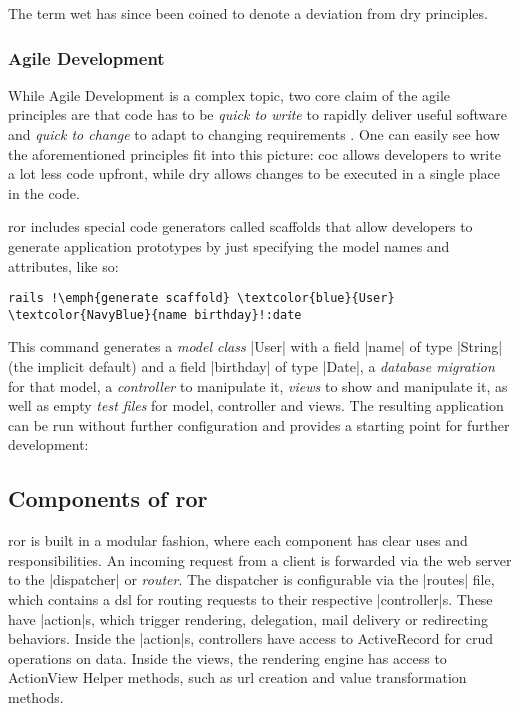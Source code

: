 The term \acrfull{wet} has since been coined to denote a deviation from \gls{dry} principles. \citep{wet}

\subsubsection{Agile Development}
\label{subsub:agile}

While Agile Development is a complex topic, two core claim of the agile principles are that code has to be \emph{quick to write} to rapidly deliver useful software \citep[Principle 1]{martin2003agile} and \emph{quick to change} to adapt to changing requirements \citep[Principle 2]{martin2003agile}. One can easily see how the aforementioned principles fit into this picture: \acrshort{coc} allows developers to write a lot less code upfront, while \acrshort{dry} allows changes to be executed in a single place in the code.

\gls{ror} includes special code generators called \gls{scaffold}s that allow developers to generate application prototypes by just specifying the model names and attributes, like so:

\begin{lstlisting}[escapechar=!]
  rails !\emph{generate scaffold} \textcolor{blue}{User} \textcolor{NavyBlue}{name birthday}!:date
\end{lstlisting}

This command generates a \emph{model class} |User| with a field |name| of type |String| (the implicit default) and a field |birthday| of type |Date|, a \emph{database migration} for that model, a \emph{controller} to manipulate it, \emph{views} to show and manipulate it, as well as empty \emph{test files} for model, controller and views. The resulting application can be run without further configuration and provides a starting point for further development:


\subsection{Components of \acrlong{ror}}

\gls{ror} is built in a modular fashion, where each component has clear uses and responsibilities.
An incoming request from a client is forwarded via the web server to the |dispatcher| or \emph{router}. The dispatcher is configurable via the |routes| file, which contains a \gls{dsl} for routing requests to their respective |controller|s. These have |action|s, which trigger rendering, delegation, mail delivery or redirecting behaviors. Inside the |action|s, controllers have access to ActiveRecord for \gls{crud} operations on data. Inside the views, the rendering engine has access to ActionView Helper methods, such as url creation and value transformation methods.

